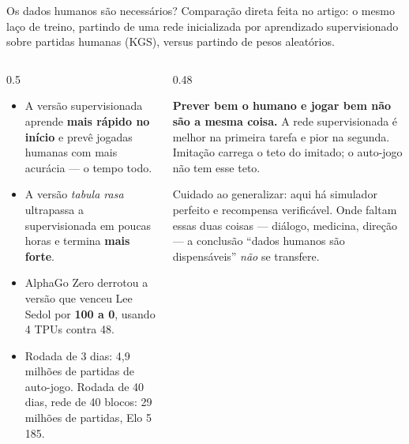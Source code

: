 \documentclass[aspectratio=169, 10pt]{beamer}
\begin{document}
\begin{frame}{Os dados humanos são necessários?}
  \footnotesize
  Comparação direta feita no artigo: o mesmo laço de treino, partindo de uma rede
  inicializada por aprendizado supervisionado sobre partidas humanas (KGS), versus
  partindo de pesos aleatórios.

  \begin{columns}[T]
    \begin{column}{0.5\textwidth}
      \begin{itemize}
        \item A versão supervisionada aprende \textbf{mais rápido no início} e
              prevê jogadas humanas com mais acurácia — o tempo todo.
        \item A versão \emph{tabula rasa} ultrapassa a supervisionada em poucas
              horas e termina \textbf{mais forte}.
        \item AlphaGo Zero derrotou a versão que venceu Lee Sedol por
              \textbf{100 a 0}, usando 4 TPUs contra 48.
        \item Rodada de 3 dias: 4,9 milhões de partidas de auto-jogo.
              Rodada de 40 dias, rede de 40 blocos: 29 milhões de partidas,
              Elo 5\,185.
      \end{itemize}
    \end{column}
    \begin{column}{0.48\textwidth}
      \begin{alertabox}
        \textbf{Prever bem o humano e jogar bem não são a mesma coisa.} A rede
        supervisionada é melhor na primeira tarefa e pior na segunda. Imitação
        carrega o teto do imitado; o auto-jogo não tem esse teto.
      \end{alertabox}
      \begin{ideiabox}
        Cuidado ao generalizar: aqui há simulador perfeito e recompensa
        verificável. Onde faltam essas duas coisas — diálogo, medicina, direção —
        a conclusão ``dados humanos são dispensáveis'' \emph{não} se transfere.
      \end{ideiabox}
    \end{column}
  \end{columns}
\end{frame}
\end{document}
